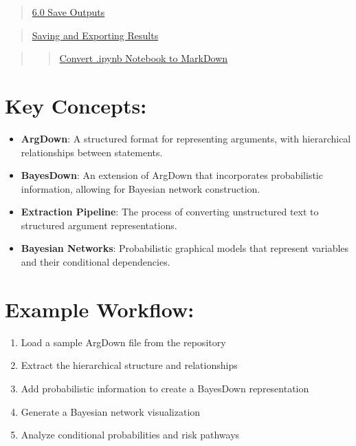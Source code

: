 \documentclass[
  11pt,
  letterpaper,
]{book}
\providecommand{\tightlist}{%
  \setlength{\itemsep}{0pt}\setlength{\parskip}{0pt}}
\begin{document}
\begin{quote}
\hyperref[scrollTo=kjbIj19epbrF]{6.0 Save Outputs}
\end{quote}

\begin{quote}
\hyperref[scrollTo=0QqlN6dYpm4s]{Saving and Exporting Results}
\end{quote}

\begin{quote}
\begin{quote}
\hyperref[scrollTo=pS6AhdiSCLw4]{Convert .ipynb Notebook to MarkDown}
\end{quote}
\end{quote}

\section{Key Concepts:}\label{key-concepts}

\begin{itemize}
\tightlist
\item
  \textbf{ArgDown}: A structured format for representing arguments, with
  hierarchical relationships between statements.
\item
  \textbf{BayesDown}: An extension of ArgDown that incorporates
  probabilistic information, allowing for Bayesian network construction.
\item
  \textbf{Extraction Pipeline}: The process of converting unstructured
  text to structured argument representations.
\item
  \textbf{Bayesian Networks}: Probabilistic graphical models that
  represent variables and their conditional dependencies.
\end{itemize}

\section{Example Workflow:}\label{example-workflow}

\begin{enumerate}
\def\labelenumi{\arabic{enumi}.}
\tightlist
\item
  Load a sample ArgDown file from the repository
\item
  Extract the hierarchical structure and relationships
\item
  Add probabilistic information to create a BayesDown representation
\item
  Generate a Bayesian network visualization
\item
  Analyze conditional probabilities and risk pathways
\end{enumerate}
\end{document}
